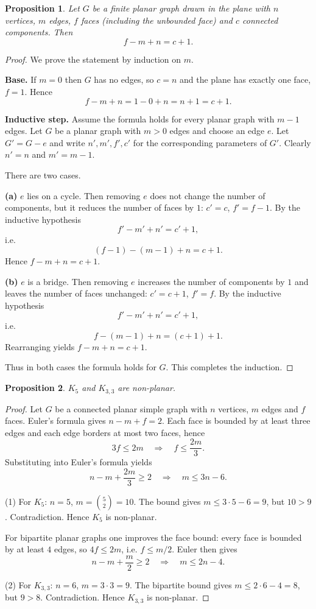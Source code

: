 \documentclass{article}
\theoremstyle{plain}
\newtheorem{proposition}{Proposition}
\theoremstyle{definition}
\theoremstyle{remark}
\begin{document}
\begin{proposition}
Let \(G\) be a finite planar graph drawn in the plane with \(n\) vertices,
\(m\) edges, \(f\) faces (including the unbounded face) and \(c\) connected
components. Then
\[
f - m + n = c + 1.
\]
\end{proposition}

\begin{proof}
We prove the statement by induction on \(m\).

\medskip
\noindent\textbf{Base.} If \(m=0\) then \(G\) has no edges, so \(c=n\) and the
plane has exactly one face, \(f=1\). Hence
\[
f-m+n = 1-0+n = n+1 = c+1.
\]

\medskip
\noindent\textbf{Inductive step.} Assume the formula holds for every planar
graph with \(m-1\) edges. Let \(G\) be a planar graph with \(m>0\) edges and
choose an edge \(e\). Let \(G'=G-e\) and write \(n',m',f',c'\) for the
corresponding parameters of \(G'\). Clearly \(n'=n\) and \(m'=m-1\).

There are two cases.

\textbf{(a)} \(e\) lies on a cycle. Then removing \(e\) does not change the
number of components, but it reduces the number of faces by \(1\): \(c'=c\),
\(f'=f-1\). By the inductive hypothesis
\[
f' - m' + n' = c' + 1,
\]
i.e.
\[
(f-1) - (m-1) + n = c + 1.
\]
Hence \(f-m+n = c+1\).

\textbf{(b)} \(e\) is a bridge. Then removing \(e\) increases the number of
components by \(1\) and leaves the number of faces unchanged: \(c'=c+1\),
\(f'=f\). By the inductive hypothesis
\[
f' - m' + n' = c' + 1,
\]
i.e.
\[
f - (m-1) + n = (c+1) + 1.
\]
Rearranging yields \(f-m+n = c+1\).

Thus in both cases the formula holds for \(G\). This completes the induction.
\end{proof}

\begin{proposition}
$K_5$ and $K_{3,3}$ are non-planar.
\end{proposition}

\begin{proof}
Let $G$ be a connected planar simple graph with $n$ vertices, $m$ edges and $f$ faces.
Euler's formula gives $n-m+f=2$. Each face is bounded by at least three edges and
each edge borders at most two faces, hence
\[
3f \le 2m \quad\Longrightarrow\quad f \le \frac{2m}{3}.
\]
Substituting into Euler's formula yields
\[
n-m+\frac{2m}{3} \ge 2 \quad\Longrightarrow\quad m \le 3n-6.
\]

(1) For $K_5$: $n=5$, $m={5\choose2}=10$. The bound gives $m\le 3\cdot5-6=9$, 
but $10>9$. Contradiction. Hence $K_5$ is non-planar.

For bipartite planar graphs one improves the face bound: every face is bounded by
at least $4$ edges, so $4f\le 2m$, i.e. $f\le m/2$. Euler then gives
\[
n-m+\frac{m}{2}\ge 2 \quad\Longrightarrow\quad m \le 2n-4.
\]

(2) For $K_{3,3}$: $n=6$, $m=3\cdot3=9$. The bipartite bound gives $m\le 2\cdot6-4=8$,
but $9>8$. Contradiction. Hence $K_{3,3}$ is non-planar.
\end{proof}
\end{document}
